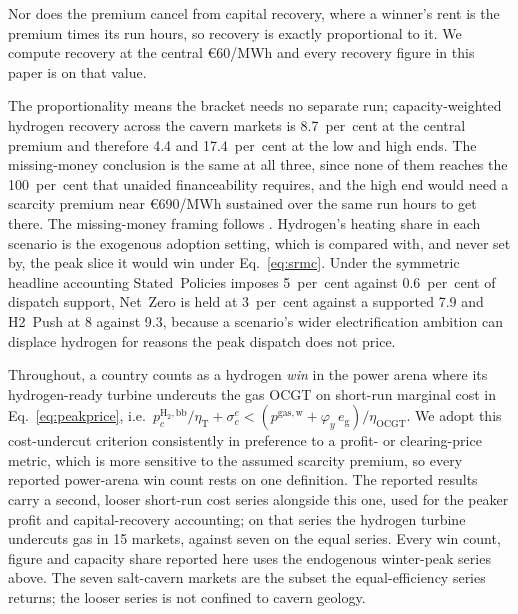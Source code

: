 Nor does the premium cancel from capital recovery,
where a winner's rent is the premium times its run hours, so recovery is exactly
proportional to it. We compute recovery at the central \euro{}60/MWh and every recovery
figure in this paper is on that value.

The proportionality means the bracket needs no separate run; capacity-weighted hydrogen
recovery across the cavern markets is 8.7~per~cent at the central premium and therefore
4.4 and 17.4~per~cent at the low and high ends. The missing-money conclusion is the same
at all three, since none of them reaches the 100~per~cent that unaided financeability
requires, and the high end would need a scarcity premium near \euro{}690/MWh sustained
over the same run hours to get there. The missing-money framing follows
\citep{Joskow2008capacity}. Hydrogen's heating share in each scenario is the exogenous adoption setting, which is compared with, and never set by, the peak slice it would win under Eq.~\eqref{eq:srmc}. Under the symmetric headline accounting Stated~Policies imposes 5~per~cent against 0.6~per~cent of dispatch support, Net~Zero is held at 3~per~cent against a supported 7.9 and H2~Push at 8 against 9.3, because a scenario's wider electrification ambition can
displace hydrogen for reasons the peak dispatch does not price.

Throughout, a country counts as a hydrogen \emph{win} in the power arena where its
hydrogen-ready turbine undercuts the gas OCGT on short-run marginal cost in
Eq.~\eqref{eq:peakprice}, i.e.\ $p^{\mathrm{H_2,bb}}_{c}/\eta_{\mathrm{T}}+\sigma^{e}_{c}
< (p^{\mathrm{gas,w}}+\varphi_{y}\,e_{\mathrm{g}})/\eta_{\mathrm{OCGT}}$. We adopt this
cost-undercut criterion consistently in preference to a profit- or clearing-price
metric, which is more sensitive to the assumed scarcity premium, so every reported
power-arena win count rests on one definition. The reported results carry a second,
looser short-run cost series alongside this one, used for the peaker profit and
capital-recovery accounting; on that series the hydrogen turbine undercuts gas in 15 markets, against seven on the equal series. Every win count, figure and capacity share reported here
uses the endogenous winter-peak series above. The seven salt-cavern markets are the subset
the equal-efficiency series returns; the looser series is not confined to cavern geology.

